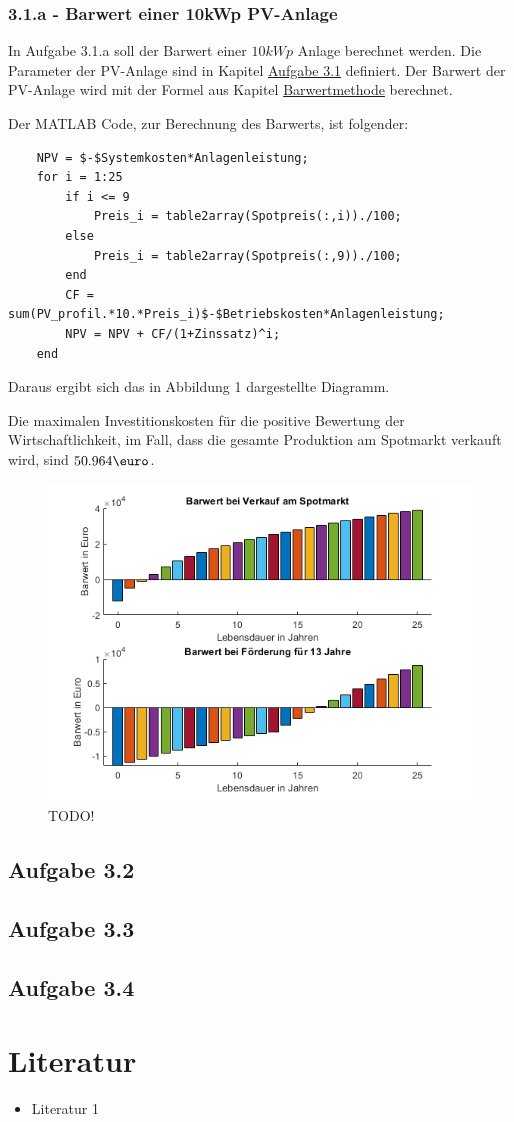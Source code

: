 \documentclass[a4paper,12pt]{article}
\begin{document}
	\subsubsection{3.1.a - Barwert einer 10kWp PV-Anlage}
	In Aufgabe 3.1.a soll der Barwert einer $10kWp$ Anlage berechnet werden. Die Parameter der PV-Anlage sind in Kapitel \hyperref[sec:Aufgabenstellung31]{Aufgabe 3.1} definiert.\newline
	Der Barwert der PV-Anlage wird mit der Formel aus Kapitel \hyperref[sec:BerechnungenBarwertmethode]{Barwertmethode} berechnet.\\ \par
	Der MATLAB Code, zur Berechnung des Barwerts, ist folgender:
	\begin{lstlisting}
	NPV = $-$Systemkosten*Anlagenleistung;
	for i = 1:25
		if i <= 9
			Preis_i = table2array(Spotpreis(:,i))./100;
		else
			Preis_i = table2array(Spotpreis(:,9))./100;
		end
		CF = sum(PV_profil.*10.*Preis_i)$-$Betriebskosten*Anlagenleistung;
		NPV = NPV + CF/(1+Zinssatz)^i;
	end
	\end{lstlisting}
	Daraus ergibt sich das in Abbildung 1 dargestellte Diagramm.\\ \par
	Die maximalen Investitionskosten für die positive Bewertung der Wirtschaftlichkeit, im Fall, dass die gesamte Produktion am Spotmarkt verkauft wird, sind $50.964\mbox{\euro}$.
	\begin{figure}[H]
		\centering
		\includegraphics[width=12cm]{img/results/BarwertVergleich}
		\caption{TODO!}
	\end{figure}
	\subsection{Aufgabe 3.2}
	\subsection{Aufgabe 3.3}
	\subsection{Aufgabe 3.4}
	\newpage
	\section{Literatur}
	\begin{itemize}
		\item Literatur 1
	\end{itemize}
	\listoffigures
\end{document}
